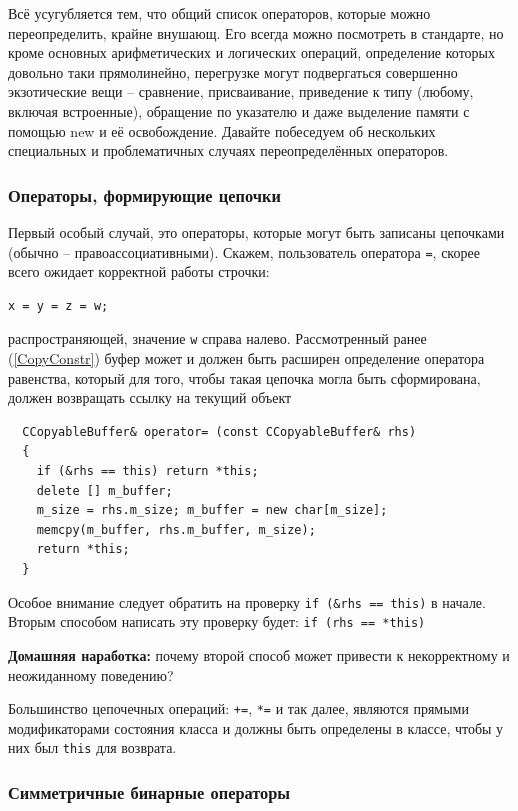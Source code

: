\documentclass[a4paper,12pt,oneside]{article}
\begin{document}
Всё усугубляется тем, что общий список операторов, которые можно переопределить, крайне внушающ. Его всегда можно посмотреть в стандарте, но кроме основных арифметических и логических операций, определение которых довольно таки прямолинейно, перегрузке могут подвергаться совершенно экзотические вещи – сравнение, присваивание, приведение к типу (любому, включая встроенные), обращение по указателю и даже выделение памяти с помощью new и её освобождение. Давайте побеседуем об нескольких специальных и проблематичных случаях переопределённых операторов.

\subsubsection{Операторы, формирующие цепочки}\label{ChainOps}

Первый особый случай, это операторы, которые могут быть записаны цепочками (обычно -- правоассоциативными). Скажем, пользователь оператора \lstinline!=!, скорее всего ожидает корректной работы строчки:

\begin{lstlisting}
x = y = z = w;
\end{lstlisting}

распространяющей, значение \lstinline!w! справа налево. Рассмотренный ранее (\ref{CopyConstr}) буфер может и должен быть расширен определение оператора равенства, который для того, чтобы такая цепочка могла быть сформирована, должен возвращать ссылку на текущий объект

\begin{lstlisting}
  CCopyableBuffer& operator= (const CCopyableBuffer& rhs)
  {
    if (&rhs == this) return *this;
    delete [] m_buffer;
    m_size = rhs.m_size; m_buffer = new char[m_size];
    memcpy(m_buffer, rhs.m_buffer, m_size);
    return *this;
  }
\end{lstlisting}

Особое внимание следует обратить на проверку \lstinline!if (&rhs == this)! в начале. Вторым способом написать эту проверку будет: \lstinline!if (rhs == *this)!

\textbf{Домашняя наработка:} почему второй способ может привести к некорректному и неожиданному поведению?

Большинство цепочечных операций: \lstinline!+=!, \lstinline!*=! и так далее, являются прямыми модификаторами состояния класса и должны быть определены в классе, чтобы у них был \lstinline!this! для возврата.

\subsubsection{Симметричные бинарные операторы}\label{SymmBinary}
\end{document}
